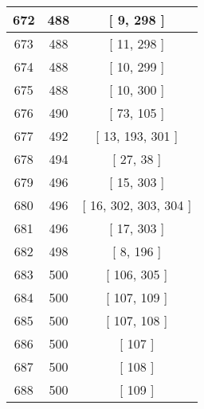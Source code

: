\begin{center}
\begin{longtable}[H]{|| c c c ||}
\hline
672 & 488 & [ 9, 298 ] \\ 
\hline
673 & 488 & [ 11, 298 ] \\ 
\hline
674 & 488 & [ 10, 299 ] \\ 
\hline
675 & 488 & [ 10, 300 ] \\ 
\hline
676 & 490 & [ 73, 105 ] \\ 
\hline
677 & 492 & [ 13, 193, 301 ] \\ 
\hline
678 & 494 & [ 27, 38 ] \\ 
\hline
679 & 496 & [ 15, 303 ] \\ 
\hline
680 & 496 & [ 16, 302, 303, 304 ] \\ 
\hline
681 & 496 & [ 17, 303 ] \\ 
\hline
682 & 498 & [ 8, 196 ] \\ 
\hline
683 & 500 & [ 106, 305 ] \\ 
\hline
684 & 500 & [ 107, 109 ] \\ 
\hline
685 & 500 & [ 107, 108 ] \\ 
\hline
686 & 500 & [ 107 ] \\ 
\hline
687 & 500 & [ 108 ] \\ 
\hline
688 & 500 & [ 109 ] \\ 
\hline
\end{longtable}
\end{center}
